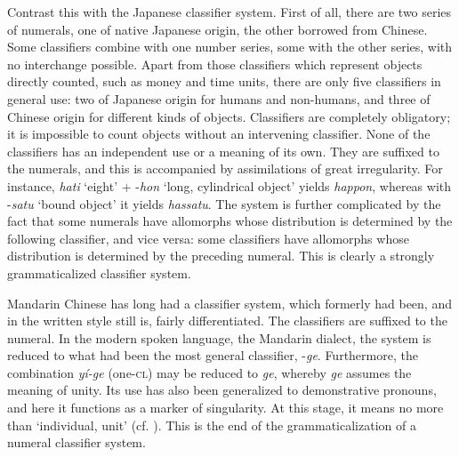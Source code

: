 Contrast this with the Japanese classifier system. First of all, there are two series of numerals, one of native Japanese origin, the other borrowed from Chinese. Some classifiers combine with one number series, some with the other series, with no interchange possible. Apart from those classifiers which represent objects directly counted, such as money and time units, there are only five classifiers in general use: two of Japanese origin for humans and non-humans, and three of Chinese origin for different kinds of objects. Classifiers are completely obligatory; it is impossible to count objects without an intervening classifier. None of the classifiers has an independent use or a meaning of its own. They are suffixed to the numerals, and this is accompanied by assimilations of great irregularity. For instance, \textit{hati} ‘eight’ + -\textit{hon} ‘long, cylindrical object’ yields \textit{happon}, whereas with -\textit{satu} ‘bound object’ it yields \textit{hassatu}. The system is further complicated by the fact that some numerals have allomorphs whose distribution is determined by the following classifier, and vice versa: some classifiers have allomorphs whose distribution is determined by the preceding numeral. This is clearly a strongly grammaticalized classifier system.

Mandarin Chinese has long had a classifier system, which formerly had been, and in the written style still is, fairly differentiated. The classifiers are suffixed to the numeral. In the modern spoken language, the Mandarin dialect, the system is reduced to what had been the most general classifier, -\textit{ge}. Furthermore, the combination \textit{yí-ge} (one-\textsc{cl}) may be reduced to \textit{ge}, whereby \textit{ge} assumes the meaning of unity. Its use has also been generalized to demonstrative pronouns, and here it functions as a marker of singularity. At this stage, it means no more than ‘individual, unit’ (cf. \citealt[24f]{Serzisko1980}). This is the end of the grammaticalization of a numeral classifier system.

